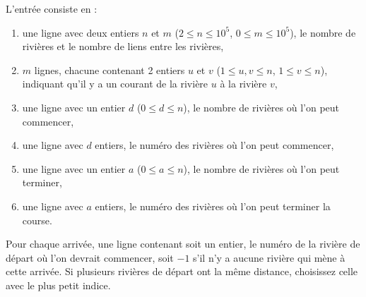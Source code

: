 \begin{Input}
    L'entrée consiste en :
    \begin{enumerate}
        \item une ligne avec deux entiers $n$ et $m$ ($2 \le n \le 10^5$, $0 \le m \le 10^5$), le nombre de rivières et le nombre de liens entre les rivières,
        \item $m$ lignes, chacune contenant 2 entiers $u$ et $v$ ($1 \le u,v \le n$, $1 \le v \le n$), indiquant qu'il y a un courant de la rivière $u$ à la rivière $v$,
        \item une ligne avec un entier $d$ ($0 \le d \le n$), le nombre de rivières où l'on peut commencer,
        \item une ligne avec $d$ entiers, le numéro des rivières où l'on peut commencer,
        \item une ligne avec un entier $a$ ($ 0 \le a \le n$), le nombre de rivières où l'on peut terminer,
        \item une ligne avec $a$ entiers, le numéro des rivières où l'on peut terminer la course.
    \end{enumerate}
\end{Input}

\begin{Output}
    Pour chaque arrivée, une ligne contenant soit un entier, le numéro de la rivière de départ où l'on devrait commencer, soit $-1$ s'il n'y a aucune rivière qui mène à cette arrivée. Si plusieurs rivières de départ ont la même distance, choisissez celle avec le plus petit indice.
\end{Output}
